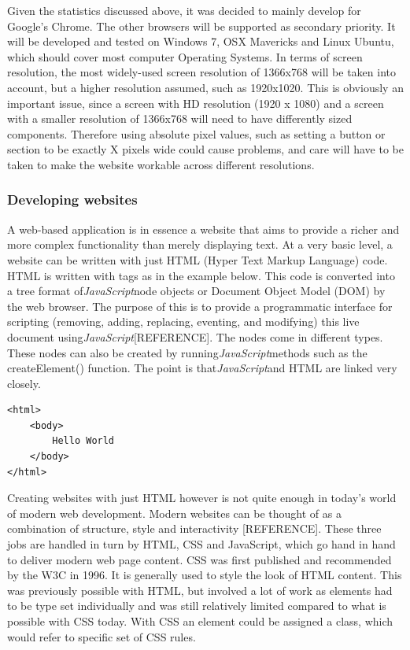 \documentclass[a4paper,11pt,twoside]{article}
\begin{document}
Given the statistics discussed above, it was decided to mainly develop for Google's Chrome. The other browsers will be supported as secondary priority. It will be developed and tested on Windows 7, OSX Mavericks and Linux Ubuntu, which should cover most computer Operating Systems. In terms of screen resolution, the most widely-used screen resolution of 1366x768 will be taken into account, but a higher resolution assumed, such as 1920x1020. This is obviously an important issue, since a screen with HD resolution (1920 x 1080) and a screen with a smaller resolution of 1366x768 will need to have differently sized components. Therefore using absolute pixel values, such as setting a button or section to be exactly X pixels wide could cause problems, and care will have to be taken to make the website workable across different resolutions.





\subsubsection{Developing websites}

A web-based application is in essence a website that aims to provide a richer and more complex functionality than merely displaying text. At a very basic level, a website can be written with just HTML (Hyper Text Markup Language) code. HTML is written with tags as in the example below. This code is converted into a tree format of\textit{JavaScript}node objects or Document Object Model (DOM) by the web browser. The purpose of this is to provide a programmatic interface for scripting (removing, adding, replacing, eventing, and modifying) this live document using\textit{JavaScript}[REFERENCE]. The nodes come in different types. These nodes can also be created by running\textit{JavaScript}methods such as the createElement() function. The point is that\textit{JavaScript}and HTML are linked very closely.

\begin{verbatim}
<html>
    <body>
        Hello World
    </body>
</html>
\end{verbatim}

Creating websites with just HTML however is not quite enough in today's world of modern web development. Modern websites can be thought of as a combination of structure, style and interactivity [REFERENCE]. These three jobs are handled in turn by HTML, CSS and JavaScript, which go hand in hand to deliver modern web page content. CSS was first published and recommended by the W3C in 1996. It is generally used to style the look of HTML content. This was previously possible with HTML, but involved a lot of work as elements had to be type set individually and was still relatively limited compared to what is possible with CSS today. With CSS an element could be assigned a class, which would refer to specific set of CSS rules.
\end{document}
